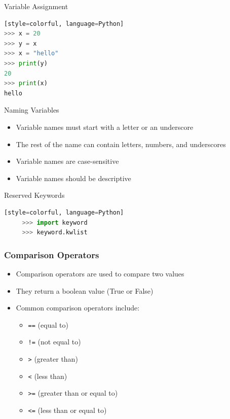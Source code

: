 \documentclass{beamer}
\begin{document}
\begin{frame}[fragile]{Variable Assignment}
    \begin{lstlisting}[style=colorful, language=Python][style=colorful, language=Python]
>>> x = 20
>>> y = x
>>> x = "hello"
>>> print(y)
20
>>> print(x)
hello
    \end{lstlisting}
\end{frame}


\begin{frame}{Naming Variables}
    \begin{itemize}
        \item Variable names must start with a letter or an underscore
        \item The rest of the name can contain letters, numbers, and underscores
        \item Variable names are case-sensitive
        \item Variable names should be descriptive
    \end{itemize}
\end{frame}

\begin{frame}[fragile]{Reserved Keywords}
    \begin{lstlisting}[style=colorful, language=Python][style=colorful, language=Python]
     >>> import keyword
     >>> keyword.kwlist      
    \end{lstlisting}
\end{frame} 

\begin{frame}
    \frametitle{Comparison Operators}
    \begin{itemize}
        \item Comparison operators are used to compare two values
        \item They return a boolean value (True or False)
        \item Common comparison operators include:
        \begin{itemize}
            \item \texttt{==} (equal to)
            \item \texttt{!=} (not equal to)
            \item \texttt{>} (greater than)
            \item \texttt{<} (less than)
            \item \texttt{>=} (greater than or equal to)
            \item \texttt{<=} (less than or equal to)
        \end{itemize}
    \end{itemize}
\end{frame}
\end{document}
